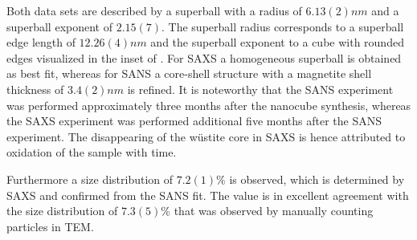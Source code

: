 \documentclass[\main/dresen_thesis.tex]{subfiles}
\begin{document}
  Both data sets are described by a superball with a radius of $6.13(2) \unit{nm}$ and a superball exponent of $2.15(7)$.
  The superball radius corresponds to a superball edge length of $12.26(4) \unit{nm}$ and the superball exponent to a cube with rounded edges visualized in the inset of .
  For SAXS a homogeneous superball is obtained as best fit, whereas for SANS a core-shell structure with a magnetite shell thickness of $3.4(2) \unit{nm}$ is refined.
  It is noteworthy that the SANS experiment was performed approximately three months after the nanocube synthesis, whereas the SAXS experiment was performed additional five months after the SANS experiment.
  The disappearing of the w\"ustite core in SAXS is hence attributed to oxidation of the sample with time.

  Furthermore a size distribution of $7.2(1) \%$ is observed, which is determined by SAXS and confirmed from the SANS fit.
  The value is in excellent agreement with the size distribution of $7.3(5) \%$ that was observed by manually counting particles in TEM.
\end{document}
